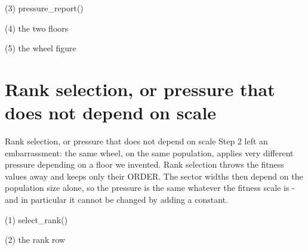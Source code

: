 \begin{frame}[fragile]{(3) pressure\_report()}

\end{frame}

\begin{frame}[fragile]{(4) the two floors}

\end{frame}

\begin{frame}[fragile]{(5) the wheel figure}

\end{frame}


\section{Rank selection, or pressure that does not depend on scale}

\begin{frame}{Rank selection, or pressure that does not depend on scale}
Step 2 left an embarrassment: the same wheel, on the same population, applies
very different pressure depending on a floor we invented. Rank selection throws
the fitness values away and keeps only their ORDER. The sector widths then
depend on the population size alone, so the pressure is the same whatever the
fitness scale is - and in particular it cannot be changed by adding a constant.
\end{frame}

\begin{frame}[fragile]{(1) select\_rank()}

\end{frame}

\begin{frame}[fragile]{(2) the rank row}

\end{frame}

